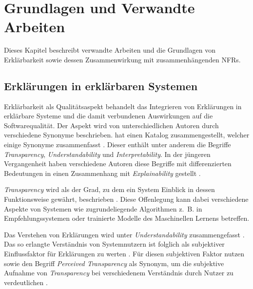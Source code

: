 \chapter{Grundlagen und Verwandte Arbeiten}

Dieses Kapitel beschreibt verwandte Arbeiten und die Grundlagen von Erklärbarkeit sowie dessen Zusammenwirkung mit zusammenhängenden NFRs.

\section{Erklärungen in erklärbaren Systemen}
\label{02_basics:explainable_system}

Erklärbarkeit als Qualitätsaspekt behandelt das Integrieren von Erklärungen in erklärbare Systeme und die damit verbundenen Auswirkungen auf die Softwarequalität. Der Aspekt wird von unterschiedlichen Autoren durch verschiedene Synonyme beschrieben. \citeauthor{brennen_what_2020} hat einen Katalog zusammengestellt, welcher einige Synonyme zusammenfasst \cite{brennen_what_2020}. Dieser enthält unter anderem die Begriffe
\textit{Transparency}, \textit{Understandability} und \textit{Interpretability}. In der jüngeren Vergangenheit haben verschiedene Autoren diese Begriffe mit differenzierten Bedeutungen in einen Zusammenhang mit \textit{Explainability} gestellt \cite{chazette_end-users_nodate,chazette_knowledge_nodate,kohl_explainability_2019,wang_integration_2020}.

\textit{Transparency} wird als der Grad, zu dem ein System Einblick in dessen Funktionsweise gewährt, beschrieben \cite{chazette_end-users_nodate}. Diese Offenlegung kann dabei verschiedene Aspekte von Systemen wie zugrundeliegende Algorithmen z.~B. in Empfehlungssystemen \cite{balog_measuring_2020} oder trainierte Modelle des Maschinellen Lernens \cite{sovrano_modelling_2020} betreffen.

Das Verstehen von Erklärungen wird unter \textit{Understandability} zusammengefasst \cite{do2010software}. Das so erlangte Verständnis von Systemnutzern ist folglich als subjektiver Einflussfaktor für Erklärungen zu werten \cite{chazette_end-users_nodate}. Für diesen subjektiven Faktor nutzen \citeauthor{wang_integration_2020} sowie \citeauthor{balog_measuring_2020} den Begriff \textit{Perceived Transparency} als Synonym, um die subjektive Aufnahme von \textit{Transparency} bei verschiedenem Verständnis durch Nutzer zu verdeutlichen \cite{wang_integration_2020, balog_measuring_2020}.

